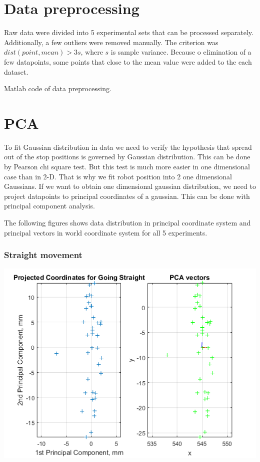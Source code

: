 \documentclass[a4paper, 12pt]{article}
\begin{document}
\section{Data preprocessing}
Raw data were divided into 5 experimental sets that can be processed separately. Additionally, a few outliers were removed manually. The criterion was $dist(point,mean)>3 s$, where $s$ is sample variance. Because o elimination of a few datapoints, some points that close to the mean value were added to the each dataset.

\medskip

Matlab code of data preprocessing.



\newpage

\section{PCA}
To fit Gaussian distribution in data we need to verify the hypothesis that spread out of the stop positions is governed by Gaussian distribution. This can be done by Pearson chi square test. But this test is much more easier in one dimensional case than in 2-D. That is why we fit robot position into 2 one dimensional Gaussians. If we want to obtain one dimensional gaussian distribution, we need to project datapoints to principal coordinates of a gaussian. This can be done with principal component analysis. 

\medskip

The following figures shows data distribution in principal coordinate system and principal vectors in world coordinate system for all 5 experiments.


\subsubsection{Straight movement}

\begin{center}
  \includegraphics[scale=0.8]{s1}
\end{center}
\end{document}
